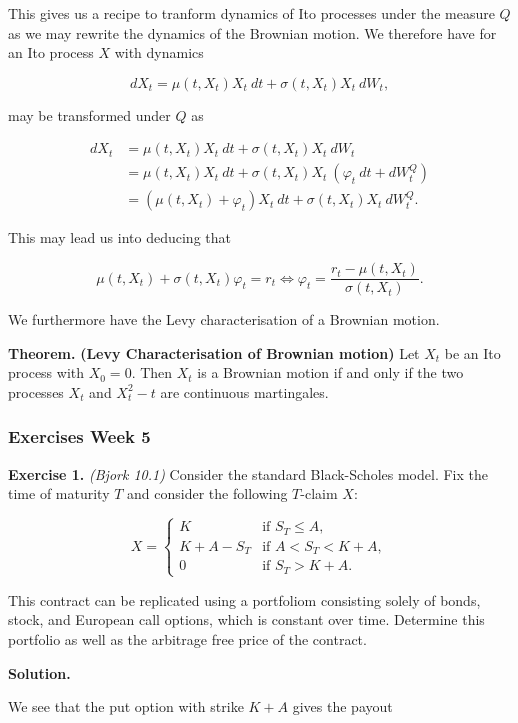 \documentclass[
]{article}
\begin{document}
This gives us a recipe to tranform dynamics of Ito processes under the
measure \(Q\) as we may rewrite the dynamics of the Brownian motion. We
therefore have for an Ito process \(X\) with dynamics

\[
dX_t=\mu(t,X_t)X_t\ dt+\sigma(t,X_t) X_t\ dW_t,
\]

may be transformed under \(Q\) as

\begin{align*}
dX_t&=\mu(t,X_t)X_t\ dt+\sigma(t,X_t) X_t\ dW_t\\
&=\mu(t,X_t)X_t\ dt+\sigma(t,X_t) X_t\ (\varphi_t\ dt+dW_t^Q)\\
&=\left(\mu(t,X_t) + \varphi_t\right) X_t\ dt + \sigma(t,X_t)X_t\ dW_t^Q.
\end{align*}

This may lead us into deducing that

\[
\mu(t,X_t)+\sigma(t,X_t)\varphi_t=r_t\iff\varphi_t=\frac{r_t-\mu(t,X_t)}{\sigma(t,X_t)}.
\]

We furthermore have the Levy characterisation of a Brownian motion.

\textbf{Theorem.} \textbf{(Levy Characterisation of Brownian motion)}
Let \(X_t\) be an Ito process with \(X_0=0\). Then \(X_t\) is a Brownian
motion if and only if the two processes \(X_t\) and \(X_t^2-t\) are
continuous martingales.

\hypertarget{exercises-week-5}{%
\subsubsection{Exercises Week 5}\label{exercises-week-5}}

\textbf{Exercise 1.} \emph{(Bjork 10.1)} Consider the standard
Black-Scholes model. Fix the time of maturity \(T\) and consider the
following \(T\)-claim \(X\):

\[
X=
\begin{cases}
  K & \text{if }S_T\le A,\\
  K+A-S_T & \text{if }A<S_T<K+ A,\\
  0 & \text{if }S_T > K+ A.
\end{cases}  
\]

This contract can be replicated using a portfoliom consisting solely of
bonds, stock, and European call options, which is constant over time.
Determine this portfolio as well as the arbitrage free price of the
contract.

\textbf{Solution.}

We see that the put option with strike \(K+A\) gives the payout
\end{document}
